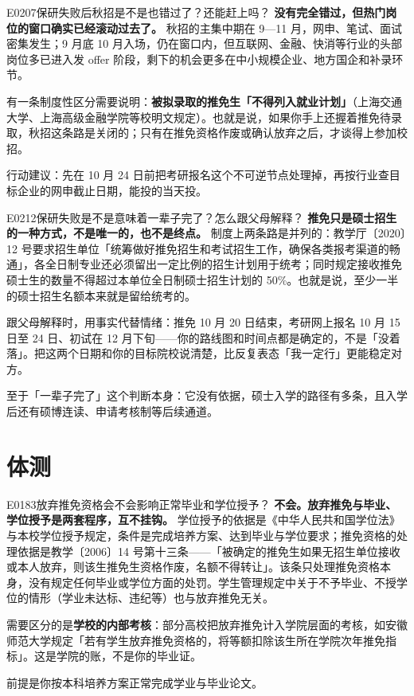 \begin{qa}{E0207}{保研失败后秋招是不是也错过了？还能赶上吗？}
\textbf{没有完全错过，但热门岗位的窗口确实已经滚动过去了。}
秋招的主集中期在 9—11 月，网申、笔试、面试密集发生；9 月底 10 月入场，仍在窗口内，但互联网、金融、快消等行业的头部岗位多已进入发 offer 阶段，剩下的机会更多在中小规模企业、地方国企和补录环节。

有一条制度性区分需要说明：\textbf{被拟录取的推免生「不得列入就业计划」}（上海交通大学、上海高级金融学院等校明文规定）。也就是说，如果你手上还握着推免待录取，秋招这条路是关闭的；只有在推免资格作废或确认放弃之后，才谈得上参加校招。

行动建议：先在 10 月 24 日前把考研报名这个不可逆节点处理掉，再按行业查目标企业的网申截止日期，能投的当天投。
\end{qa}

\begin{qa}{E0212}{保研失败是不是意味着一辈子完了？怎么跟父母解释？}
\textbf{推免只是硕士招生的一种方式，不是唯一的，也不是终点。}
制度上两条路是并列的：教学厅〔2020〕12 号要求招生单位「统筹做好推免招生和考试招生工作，确保各类报考渠道的畅通」，各全日制专业还必须留出一定比例的招生计划用于统考；同时规定接收推免硕士生的数量不得超过本单位全日制硕士招生计划的 50\%。也就是说，至少一半的硕士招生名额本来就是留给统考的。

跟父母解释时，用事实代替情绪：推免 10 月 20 日结束，考研网上报名 10 月 15 日至 24 日、初试在 12 月下旬——你的路线图和时间点都是确定的，不是「没着落」。把这两个日期和你的目标院校说清楚，比反复表态「我一定行」更能稳定对方。

至于「一辈子完了」这个判断本身：它没有依据，硕士入学的路径有多条，且入学后还有硕博连读、申请考核制等后续通道。
\end{qa}

\section{体测}
\begin{qa}{E0183}{放弃推免资格会不会影响正常毕业和学位授予？}
\textbf{不会。放弃推免与毕业、学位授予是两套程序，互不挂钩。}
学位授予的依据是《中华人民共和国学位法》与本校学位授予规定，条件是完成培养方案、达到毕业与学位要求；推免资格的处理依据是教学〔2006〕14 号第十三条——「被确定的推免生如果无招生单位接收或本人放弃，则该生推免生资格作废，名额不得转让」。该条只处理推免资格本身，没有规定任何毕业或学位方面的处罚。学生管理规定中关于不予毕业、不授学位的情形（学业未达标、违纪等）也与放弃推免无关。

需要区分的是\textbf{学校的内部考核}：部分高校把放弃推免计入学院层面的考核，如安徽师范大学规定「若有学生放弃推免资格的，将等额扣除该生所在学院次年推免指标」。这是学院的账，不是你的毕业证。

前提是你按本科培养方案正常完成学业与毕业论文。
\end{qa}

